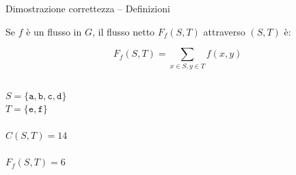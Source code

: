 \begin{frame}{Dimostrazione correttezza -- Definizioni}

\vspace{-9pt}
\begin{myboxtitle}
Se $f$ è un flusso in $G$, il \alert{flusso netto} $F_f(S,T)$ 
attraverso $(S,T)$ è:

\[
  F_f(S,T) = \sum_{x \in S, y \in T} f(x,y)
\]
\end{myboxtitle}

\vspace{-12pt}
\begin{columns}[T]
\vspace{18pt}
$S = \{ \mathtt{a}, \mathtt{b}, \mathtt{c}, \mathtt{d} \}$\\
$T = \{ \mathtt{e}, \mathtt{f} \}$\\
~\\
$C(S,T) = 14$\\
~\\
$F_f(S,T) = 6$
\end{columns}

\end{frame}

